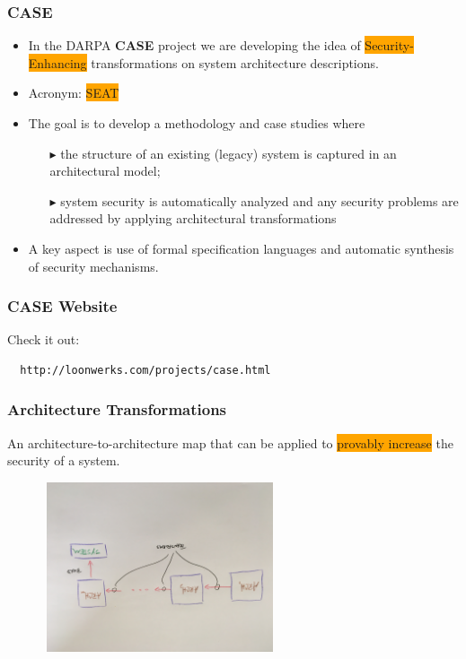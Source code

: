 \documentclass{beamer}
\newcommand{\kemph}[1]{\colorbox{orange}{#1}}
\begin{document}
\begin{frame}\frametitle{CASE}
\begin{itemize}

\item In the DARPA \textbf{CASE} project we are developing the idea of
  \kemph{Security-Enhancing} transformations on system architecture
  descriptions.

\item Acronym: \colorbox{orange}{SEAT}

\item The goal is to develop a methodology and case studies where
  \begin{itemize}
  \item [$\blacktriangleright$]
       the structure of an existing (legacy) system is captured in an architectural model;

 \item [$\blacktriangleright$] system security is automatically analyzed and any security
   problems are addressed by applying architectural transformations
 \end{itemize}

\item A key aspect is use of formal specification languages and
  automatic synthesis of security mechanisms.

\end{itemize}

\end{frame}

\begin{frame}[fragile]\frametitle{CASE Website}

Check it out:

\begin{verbatim}
  http://loonwerks.com/projects/case.html
\end{verbatim}

\end{frame}


\begin{frame}\frametitle{Architecture Transformations}

An architecture-to-architecture map that can be applied to
\kemph{provably increase} the security of a system.

\vspace*{4mm}

\includegraphics[width=90mm,height=50mm]{arch-trans.jpg}
\end{frame}
\end{document}
